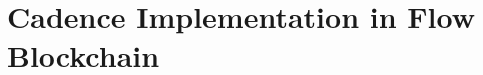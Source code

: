 \documentclass[./main.tex]{subfiles}
\begin{document}
\section{Cadence Implementation in Flow Blockchain}
\label{sec:cadence_implementation}
\end{document}
